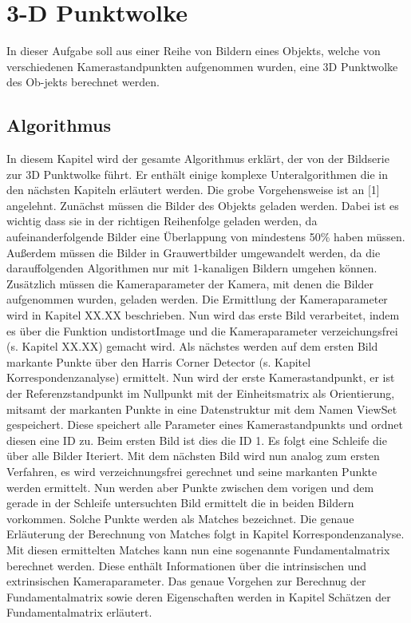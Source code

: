 \section{3-D Punktwolke}
\label{3-D Punktwolke}
In dieser Aufgabe soll aus einer Reihe von Bildern eines Objekts, welche von verschiedenen Kamerastandpunkten aufgenommen wurden, eine 3D Punktwolke des Ob-jekts berechnet werden. 

\subsection{Algorithmus}
In diesem Kapitel wird der gesamte Algorithmus erklärt, der von der Bildserie zur 3D Punktwolke führt. Er enthält einige komplexe Unteralgorithmen die in den nächsten Kapiteln erläutert werden. Die grobe Vorgehensweise ist an [1] angelehnt.
Zunächst müssen die Bilder des Objekts geladen werden. Dabei ist es wichtig dass sie in der richtigen Reihenfolge geladen werden, da aufeinanderfolgende Bilder eine Überlappung von mindestens 50\% haben müssen. Außerdem müssen die Bilder in Grauwertbilder umgewandelt werden, da die darauffolgenden Algorithmen nur mit 1-kanaligen Bildern umgehen können. Zusätzlich müssen die Kameraparameter der Kamera, mit denen die Bilder aufgenommen wurden, geladen werden. Die Ermittlung der Kameraparameter wird in Kapitel XX.XX  beschrieben.
Nun wird das erste Bild verarbeitet, indem es über die Funktion undistortImage und die Kameraparameter verzeichungsfrei (s. Kapitel XX.XX) gemacht wird.
Als nächstes werden auf dem ersten Bild markante Punkte über den Harris Corner Detector (s. Kapitel Korrespondenzanalyse) ermittelt. Nun wird der erste Kamerastandpunkt, er ist der Referenzstandpunkt im Nullpunkt mit der Einheitsmatrix als Orientierung, mitsamt der markanten Punkte in eine Datenstruktur mit dem Namen ViewSet gespeichert. Diese speichert alle Parameter eines Kamerastandpunkts und ordnet diesen eine ID zu. Beim ersten Bild ist dies die ID 1.
Es folgt eine Schleife die über alle Bilder Iteriert. Mit dem nächsten Bild wird nun analog zum ersten Verfahren, es wird verzeichnungsfrei gerechnet und seine markanten Punkte werden ermittelt. Nun werden aber Punkte zwischen dem vorigen und dem gerade in der Schleife untersuchten Bild ermittelt die in beiden Bildern vorkommen. Solche Punkte werden als Matches bezeichnet. Die genaue Erläuterung der Berechnung von Matches folgt in Kapitel Korrespondenzanalyse.
Mit diesen ermittelten Matches kann nun eine sogenannte Fundamentalmatrix berechnet werden. Diese enthält Informationen über die intrinsischen und extrinsischen Kameraparameter. Das genaue Vorgehen zur Berechnug der Fundamentalmatrix sowie deren Eigenschaften werden in Kapitel Schätzen der Fundamentalmatrix erläutert. 
